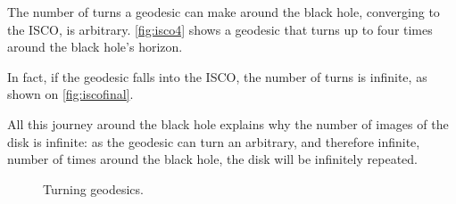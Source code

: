 The number of turns a geodesic can make around the black hole, converging to the \ac{ISCO}, is arbitrary. \autoref{fig:isco4} shows a geodesic that turns up to four times around the black hole's horizon.

In fact, if the geodesic falls into the \ac{ISCO}, the number of turns is infinite, as shown on \autoref{fig:iscofinal}.

All this journey around the black hole explains why the number of images of the disk is infinite: as the geodesic can turn an arbitrary, and therefore infinite, number of times around the black hole, the disk will be infinitely repeated.

\begin{figure}[bth]
	\myfloatalign
	 \quad
	\caption[Turning geodesics]{Turning geodesics.}
\end{figure}
